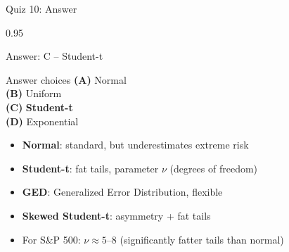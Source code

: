 \documentclass[9pt, aspectratio=169, t]{beamer}
\begin{document}
\begin{frame}{Quiz 10: Answer}
    \begin{cminipage}{0.95\textwidth}
    {\small
    \begin{exampleblock}{Answer: C -- Student-t}

    \vspace{0.1cm}

    \begin{block}{Answer choices}
        \textcolor{MainBlue}{\textbf{(A)}} Normal \incorrect\\[2pt]
        \textcolor{MainBlue}{\textbf{(B)}} Uniform \incorrect\\[2pt]
        \textcolor{MainBlue}{\textbf{(C)}} \textbf{\textcolor{Forest}{Student-t}} \correct\\[2pt]
        \textcolor{MainBlue}{\textbf{(D)}} Exponential \incorrect
    \end{block}

        \vspace{0.1cm}

        \begin{itemize}\setlength{\itemsep}{0pt}
            \item \textbf{Normal}: standard, but underestimates extreme risk
            \item \textbf{Student-t}: fat tails, parameter $\nu$ (degrees of freedom)
            \item \textbf{GED}: Generalized Error Distribution, flexible
            \item \textbf{Skewed Student-t}: asymmetry + fat tails
            \item For S\&P 500: $\nu \approx 5$--$8$ (significantly fatter tails than normal)
        \end{itemize}
    \end{exampleblock}
    }

    \end{cminipage}
\end{frame}
\end{document}
